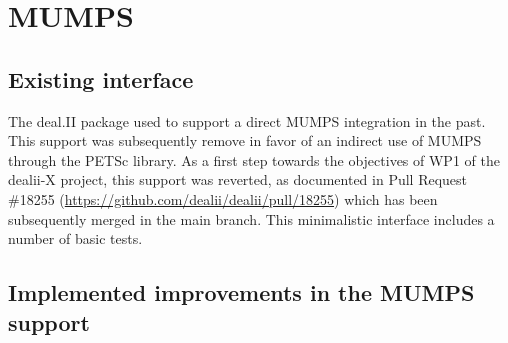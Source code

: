 \documentclass[a4paper,12pt]{article}
\begin{document}




\newpage

\section{MUMPS}
\label{sec:section2}

\subsection{Existing interface}

The deal.II package used to support a direct MUMPS integration in the
past. This support was subsequently remove in favor of an indirect use
of MUMPS through the PETSc library. As a first step towards the
objectives of WP1 of the dealii-X project, this support was reverted,
as documented in Pull Request \#18255
(\url{https://github.com/dealii/dealii/pull/18255}) which has been
subsequently merged in the main branch. This minimalistic interface
includes a number of basic tests.


\subsection{Implemented improvements in the MUMPS support}
\end{document}
